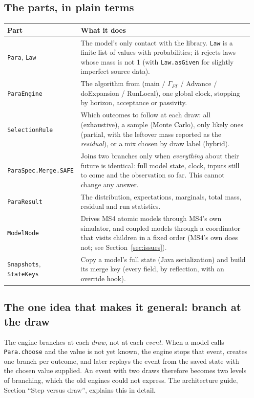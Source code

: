\documentclass[11pt]{article}
\newcommand{\code}[1]{\texttt{#1}}
\begin{document}
\subsection{The parts, in plain terms}
\begin{tabularx}{\linewidth}{@{}>{\raggedright}p{4.3cm}Y@{}}
\toprule
\textbf{Part} & \textbf{What it does}\\
\midrule
\code{Para}, \code{Law} & The model's only contact with the library. \code{Law} is a finite list of values with
  probabilities; it rejects laws whose mass is not 1 (with \code{Law.asGiven} for slightly imperfect source data).\\
\code{ParaEngine} & The algorithm from  (main / $\Gamma_{PT}$ / Advance / doExpansion /
  RunLocal), one global clock, stopping by horizon, acceptance or passivity.\\
\code{SelectionRule} & Which outcomes to follow at each draw: all (exhaustive), a sample (Monte Carlo), only likely
  ones (partial, with the leftover mass reported as the \emph{residual}), or a mix chosen by draw label (hybrid).\\
\code{ParaSpec.Merge.SAFE} & Joins two branches only when \emph{everything} about their future is identical: full
  model state, clock, inputs still to come and the observation so far. This cannot change any answer.\\
\code{ParaResult} & The distribution, expectations, marginals, total mass, residual and run statistics.\\
\code{ModelNode} & Drives MS4 atomic models through MS4's own simulator, and coupled models through a coordinator
  that visits children in a fixed order (MS4's own does not; see Section~\ref{sec:issues}).\\
\code{Snapshots}, \code{StateKeys} & Copy a model's full state (Java serialization) and build its merge key (every
  field, by reflection, with an override hook).\\
\bottomrule
\end{tabularx}

\subsection{The one idea that makes it general: branch at the draw}
The engine branches at each \emph{draw}, not at each \emph{event}. When a model calls \code{Para.choose} and the
value is not yet known, the engine stops that event, creates one branch per outcome, and later replays the event from
the saved state with the chosen value supplied. An event with two draws therefore becomes two levels of branching,
which the old engines could not express. The architecture guide, Section ``Step versus draw'', explains this in detail.
\end{document}
